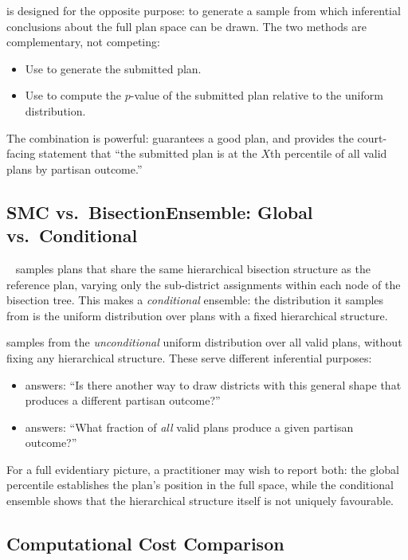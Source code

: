 \smc{} is designed for the opposite purpose: to generate a sample from which
inferential conclusions about the full plan space can be drawn.
The two methods are complementary, not competing:

\begin{itemize}
  \item Use \cs{} to generate the submitted plan.
  \item Use \smc{} to compute the $p$-value of the submitted plan relative to
        the uniform distribution.
\end{itemize}

The combination is powerful: \cs{} guarantees a good plan, and \smc{}
provides the court-facing statement that ``the submitted plan is at the
$X$th percentile of all valid plans by partisan outcome.''

\subsection{SMC vs.\ BisectionEnsemble: Global vs.\ Conditional}

\be{}~\citep{h1paper} samples plans that share the same hierarchical
bisection structure as the reference plan, varying only the sub-district
assignments within each node of the bisection tree.
This makes \be{} a \emph{conditional} ensemble: the distribution it samples
from is the uniform distribution over plans with a fixed hierarchical structure.

\smc{} samples from the \emph{unconditional} uniform distribution over all
valid plans, without fixing any hierarchical structure.
These serve different inferential purposes:
\begin{itemize}
  \item \be{} answers: ``Is there another way to draw districts with this
        general shape that produces a different partisan outcome?''
  \item \smc{} answers: ``What fraction of \emph{all} valid plans produce
        a given partisan outcome?''
\end{itemize}

For a full evidentiary picture, a practitioner may wish to report both: the
\smc{} global percentile establishes the plan's position in the full space,
while the \be{} conditional ensemble shows that the hierarchical structure
itself is not uniquely favourable.

\subsection{Computational Cost Comparison}

